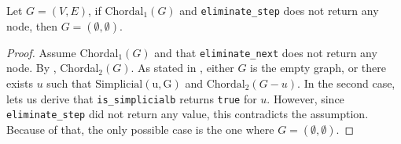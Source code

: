 \begin{theorem}\label{cor:inv-elim-2}
    Let $G = (V, E)$, if $\mathrm{Chordal}_1(G)$ and \texttt{eliminate\_step} does not return any node, then $G = (\emptyset, \emptyset)$.
\end{theorem}
\begin{proof}
    Assume Chordal$_1(G)$ and that \texttt{eliminate\_next} does not return any node. By , Chordal$_2(G)$. As stated in , either $G$ is the empty graph, or there exists $u$ such that $\mathrm{Simplicial(u, G)}$ and $\mathrm{Chordal}_2(G - u)$. In the second case,  lets us derive that \texttt{is\_simplicialb} returns \texttt{true} for $u$. However, since \texttt{eliminate\_step} did not return any value, this contradicts the assumption. Because of that, the only possible case is the one where $G = (\emptyset, \emptyset)$.
\end{proof}